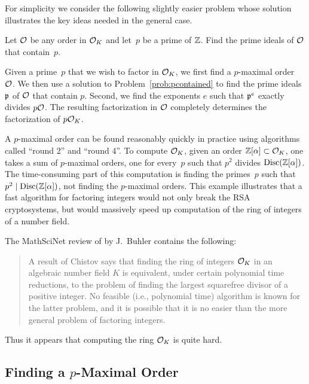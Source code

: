 For simplicity we consider the following slightly easier problem whose
solution illustrates the key ideas needed in the general case.
\begin{problem}\label{prob:pcontained}
  Let $\mathcal{O}$ be any order in $\mathcal{O}_K$ and let~$p$ be a prime of $\mathbb{Z}$.
  Find the prime ideals of $\mathcal{O}$ that contain~$p$.
\end{problem}

Given a prime~$p$
that we wish to factor in $\mathcal{O}_K$, we first find a $p$-maximal order~$\mathcal{O}$.
We then use a solution to Problem~\ref{prob:pcontained} to find
the prime ideals $\mathfrak{p}$ of $\mathcal{O}$ that contain $p$.  Second, we find
the exponents $e$ such that $\mathfrak{p}^e$ exactly divides $p\mathcal{O}$.
The resulting factorization in $\mathcal{O}$ completely determines
the factorization of $p\mathcal{O}_K$.

A $p$-maximal order can be found reasonably quickly in practice using
algorithms called ``round 2'' and ``round 4''.  To
compute $\mathcal{O}_K$, given an order $\mathbb{Z}[\alpha]\subset \mathcal{O}_K$, one takes a
sum of $p$-maximal orders, one for every~$p$ such that $p^2$ divides
$\operatorname{Disc}(\mathbb{Z}[\alpha])$.  The time-consuming part of this computation is
finding the primes~$p$ such that $p^2\mid \operatorname{Disc}(\mathbb{Z}[\alpha])$, not
finding the $p$-maximal orders.  This example illustrates that
a fast algorithm for factoring integers would not only break the RSA
cryptosystems, but would massively speed up computation of the ring of
integers of a number field.
\begin{remark}
  The MathSciNet review of \cite{buchmann_lenstra:approx} by
  J.~Buhler contains the following:
  \begin{quote}
      A result of Chistov says that finding the ring of integers $\mathcal{O}_K$
      in an algebraic number field $K$ is equivalent, under certain
      polynomial time reductions, to the problem of finding the largest
      squarefree divisor of a positive integer. No feasible (i.e.,
      polynomial time) algorithm is known for the latter problem, and it
      is possible that it is no easier than the more general problem of
      factoring integers.
  \end{quote}
  Thus it appears that computing the ring $\mathcal{O}_K$ is quite hard.
\end{remark}

\subsection{Finding a $p$-Maximal Order}\label{sec:alg_pmax}


